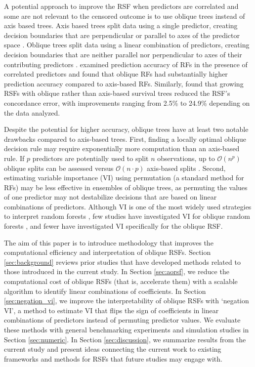 \documentclass[twoside,11pt]{article}\usepackage[]{graphicx}\usepackage[]{xcolor}
\newcommand{\ie}{that is}
\newcommand{\secref}[1]{Section \ref{#1}}
\begin{document}
A potential approach to improve the RSF when predictors are correlated and some are not relevant to the censored outcome is to use oblique trees instead of axis based trees. Axis based trees split data using a single predictor, creating decision boundaries that are perpendicular or parallel to axes of the predictor space \citep[see][Chapter~2]{breiman2017classification}. Oblique trees split data using a linear combination of predictors, creating decision boundaries that are neither parallel nor perpendicular to axes of their contributing predictors \citep[see][Chapter~5]{breiman2017classification}. \citet{menze2011oblique} examined prediction accuracy of RFs in the presence of correlated predictors and found that oblique RFs had substantially higher prediction accuracy compared to axis-based RFs. Similarly, \citet{jaeger2019oblique} found that growing RSFs with oblique rather than axis-based survival trees reduced the RSF's concordance error, with improvements ranging from 2.5\% to 24.9\% depending on the data analyzed.

Despite the potential for higher accuracy, oblique trees have at least two notable drawbacks compared to axis-based trees. First, finding a locally optimal oblique decision rule may require exponentially more computation than an axis-based rule. If $p$ predictors are potentially used to split $n$ observations, up to $\mathcal{O}(n^p)$ oblique splits can be assessed versus $\mathcal{O}(n \cdot p)$ axis-based splits \citep{heath1993induction, murthy1994system}. Second, estimating variable importance (VI) using permutation (a standard method for RFs) may be less effective in ensembles of oblique trees, as permuting the values of one predictor may not destabilize decisions that are based on linear combinations of predictors. Although VI is one of the most widely used strategies to interpret random forests \citep{ishwaran2019standard}, few studies have investigated VI for oblique random forests \citep[see][Section~5]{menze2011oblique}, and fewer have investigated VI specifically for the oblique RSF.

The aim of this paper is to introduce methodology that improves the computational efficiency and interpretation of oblique RSFs. \secref{sec:background} reviews prior studies that have developed methods related to those introduced in the current study. In \secref{sec:aorsf}, we reduce the computational cost of oblique RSFs (\ie, accelerate them) with a scalable algorithm to identify linear combinations of coefficients. In \secref{sec:negation_vi}, we improve the interpretability of oblique RSFs with `negation VI', a method to estimate VI that flips the sign of coefficients in linear combinations of predictors instead of permuting predictor values. We evaluate these methods with general benchmarking experiments and simulation studies in \secref{sec:numeric}. In \secref{sec:discussion}, we summarize results from the current study and present ideas connecting the current work to existing frameworks and methods for RSFs that future studies may engage with.
\end{document}
